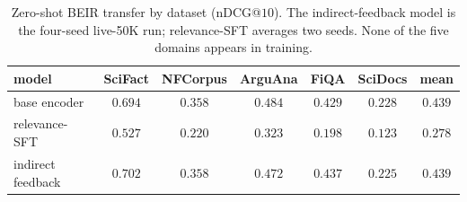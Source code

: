 \begin{table}[H]
\centering\small
\caption{Zero-shot BEIR transfer by dataset (nDCG@$10$). The indirect-feedback model is the
four-seed live-50K run; relevance-SFT averages two seeds. None of the five domains appears in
training.}
\label{tab:rag_beir}
\begin{tabular}{lcccccc}
\toprule
model & SciFact & NFCorpus & ArguAna & FiQA & SciDocs & mean \\
\midrule
base encoder & $0.694$ & $0.358$ & $0.484$ & $0.429$ & $0.228$ & $0.439$ \\
relevance-SFT & $0.527$ & $0.220$ & $0.323$ & $0.198$ & $0.123$ & $0.278$ \\
indirect feedback & $0.702$ & $0.358$ & $0.472$ & $0.437$ & $0.225$ & $\mathbf{0.439}$ \\
\bottomrule
\end{tabular}
\end{table}
